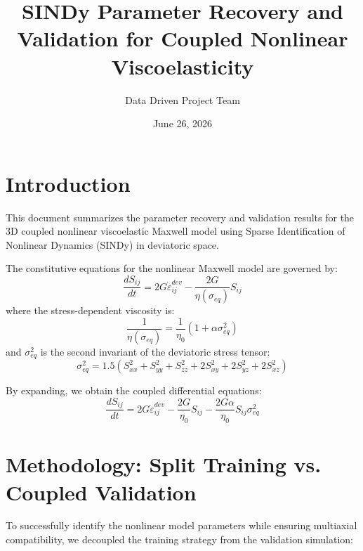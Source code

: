 \documentclass{article}
\title{SINDy Parameter Recovery and Validation for Coupled Nonlinear Viscoelasticity}
\author{Data Driven Project Team}
\date{June 26, 2026}
\begin{document}
\maketitle

\section{Introduction}
This document summarizes the parameter recovery and validation results for the 3D coupled nonlinear viscoelastic Maxwell model using Sparse Identification of Nonlinear Dynamics (SINDy) in deviatoric space. 

The constitutive equations for the nonlinear Maxwell model are governed by:
\begin{equation}
    \frac{d S_{ij}}{dt} = 2G \dot{\varepsilon}^{dev}_{ij} - \frac{2G}{\eta(\sigma_{eq})} S_{ij}
\end{equation}
where the stress-dependent viscosity is:
\begin{equation}
    \frac{1}{\eta(\sigma_{eq})} = \frac{1}{\eta_0} (1 + \alpha \sigma_{eq}^2)
\end{equation}
and $\sigma_{eq}^2$ is the second invariant of the deviatoric stress tensor:
\begin{equation}
    \sigma_{eq}^2 = 1.5 \left( S_{xx}^2 + S_{yy}^2 + S_{zz}^2 + 2 S_{xy}^2 + 2 S_{yz}^2 + 2 S_{xz}^2 \right)
\end{equation}

By expanding, we obtain the coupled differential equations:
\begin{equation}
    \frac{d S_{ij}}{dt} = 2G \dot{\varepsilon}^{dev}_{ij} - \frac{2G}{\eta_0} S_{ij} - \frac{2G\alpha}{\eta_0} S_{ij} \sigma_{eq}^2
\end{equation}

\section{Methodology: Split Training vs. Coupled Validation}
To successfully identify the nonlinear model parameters while ensuring multiaxial compatibility, we decoupled the training strategy from the validation simulation:
\end{document}
